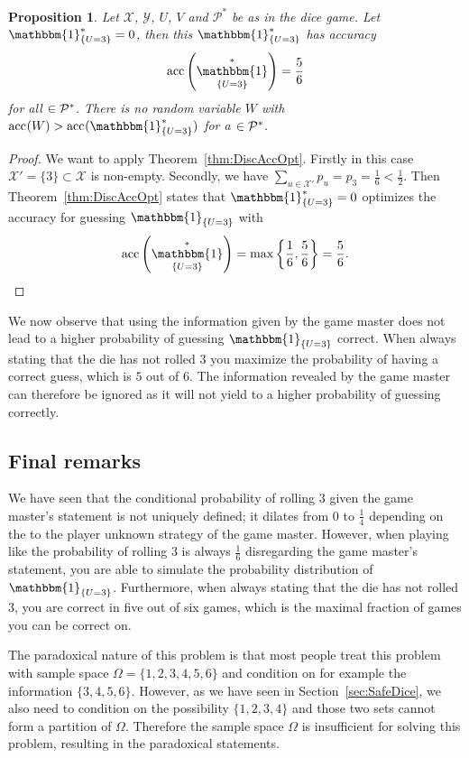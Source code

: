 \documentclass[a4paper]{report}
\theoremstyle{plain}
\newtheorem{proposition}[theorem]{Proposition}
\theoremstyle{definition}
\theoremstyle{remark}
\numberwithin{equation}{chapter}
\let\P\relax
\DeclareMathOperator{\P}{\mathbb{P}}
\DeclareMathOperator{\1}{\mathbbm{1}}
\newcommand{\X}{\mathcal{X}}
\newcommand{\Y}{\mathcal{Y}}
\DeclareMathOperator{\acc}{acc}
\newcommand{\Pmod}{\mathcal{P}^*}
\newcommand{\DieInd}{\1_{\{U=3\}}}
\begin{document}
\begin{proposition}
Let $\X$, $\Y$, $U$, $V$ and $\Pmod$ be as in the dice game. Let $\DieInd^*=0$, then this $\DieInd^*$ has accuracy
\begin{equation}
\acc^{\P}\left(\DieInd^*\right)=\frac{5}{6}
\end{equation}
for all $\P\in\Pmod$. There is no random variable $W$ with $\acc^{\P}(W)>\acc^{\P}(\DieInd^*)$ for a $\P\in\Pmod$.
\end{proposition}
\begin{proof}
We want to apply Theorem~\ref{thm:DiscAccOpt}. Firstly in this case $\X'=\{3\}\subset\X$ is non-empty. Secondly, we have $\sum_{u\in\X'}p_u=p_3=\frac{1}{6}<\frac{1}{2}$. Then Theorem~\ref{thm:DiscAccOpt} states that $\DieInd^*=0$ optimizes the accuracy for guessing $\DieInd$ with
\begin{equation}
\acc^{\P}\left(\DieInd^*\right)=\max\left\{\frac{1}{6},\frac{5}{6}\right\}=\frac{5}{6}.
\end{equation}
\end{proof}

We now observe that using the information given by the game master does not lead to a higher probability of guessing $\DieInd$ correct. When always stating that the die has not rolled $3$ you maximize the probability of having a correct guess, which is $5$ out of $6$. The information revealed by the game master can therefore be ignored as it will not yield to a higher probability of guessing correctly.

\subsection{Final remarks}
We have seen that the conditional probability of rolling $3$ given the game master's statement is not uniquely defined; it dilates from $0$ to $\frac{1}{4}$ depending on the to the player unknown strategy of the game master. However, when playing like the probability of rolling $3$ is always $\frac{1}{6}$ disregarding the game master's statement, you are able to simulate the probability distribution of $\DieInd$. Furthermore, when always stating that the die has not rolled $3$, you are correct in five out of six games, which is the maximal fraction of games you can be correct on.

The paradoxical nature of this problem is that most people treat this problem with sample space $\Omega=\{1,2,3,4,5,6\}$ and condition on for example the information $\{3,4,5,6\}$. However, as we have seen in Section~\ref{sec:SafeDice}, we also need to condition on the possibility $\{1,2,3,4\}$ and those two sets cannot form a partition of $\Omega$. Therefore the sample space $\Omega$ is insufficient for solving this problem, resulting in the paradoxical statements.
\end{document}
